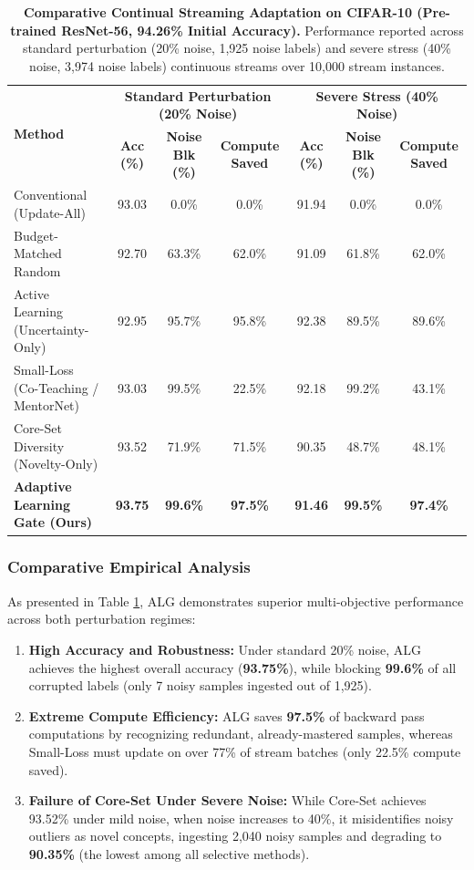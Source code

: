 \documentclass[journal,10pt,twocolumn]{article}
\begin{document}
\begin{table}[t]
\centering
\small
\caption{\textbf{Comparative Continual Streaming Adaptation on CIFAR-10 (Pre-trained ResNet-56, 94.26\% Initial Accuracy).} Performance reported across standard perturbation (20\% noise, 1,925 noise labels) and severe stress (40\% noise, 3,974 noise labels) continuous streams over 10,000 stream instances.}
\label{tab:main_results}
\begin{tabular}{l|ccc|ccc}
\toprule
\multirow{2}{*}{\textbf{Method}} & \multicolumn{3}{c|}{\textbf{Standard Perturbation (20\% Noise)}} & \multicolumn{3}{c}{\textbf{Severe Stress (40\% Noise)}} \\
& \textbf{Acc (\%)} & \textbf{Noise Blk (\%)} & \textbf{Compute Saved} & \textbf{Acc (\%)} & \textbf{Noise Blk (\%)} & \textbf{Compute Saved} \\
\midrule
Conventional (Update-All) & 93.03 & 0.0\% & 0.0\% & 91.94 & 0.0\% & 0.0\% \\
Budget-Matched Random & 92.70 & 63.3\% & 62.0\% & 91.09 & 61.8\% & 62.0\% \\
Active Learning (Uncertainty-Only) & 92.95 & 95.7\% & 95.8\% & 92.38 & 89.5\% & 89.6\% \\
Small-Loss (Co-Teaching / MentorNet) & 93.03 & 99.5\% & 22.5\% & 92.18 & 99.2\% & 43.1\% \\
Core-Set Diversity (Novelty-Only) & 93.52 & 71.9\% & 71.5\% & 90.35 & 48.7\% & 48.1\% \\
\textbf{Adaptive Learning Gate (Ours)} & \textbf{93.75} & \textbf{99.6\%} & \textbf{97.5\%} & \textbf{91.46} & \textbf{99.5\%} & \textbf{97.4\%} \\
\bottomrule
\end{tabular}
\end{table}

\subsubsection{Comparative Empirical Analysis}
As presented in Table \ref{tab:main_results}, ALG demonstrates superior multi-objective performance across both perturbation regimes:
\begin{enumerate}
    \item \textbf{High Accuracy and Robustness:} Under standard 20\% noise, ALG achieves the highest overall accuracy (\textbf{93.75\%}), while blocking \textbf{99.6\%} of all corrupted labels (only 7 noisy samples ingested out of 1,925).
    \item \textbf{Extreme Compute Efficiency:} ALG saves \textbf{97.5\%} of backward pass computations by recognizing redundant, already-mastered samples, whereas Small-Loss must update on over 77\% of stream batches (only 22.5\% compute saved).
    \item \textbf{Failure of Core-Set Under Severe Noise:} While Core-Set achieves 93.52\% under mild noise, when noise increases to 40\%, it misidentifies noisy outliers as novel concepts, ingesting 2,040 noisy samples and degrading to \textbf{90.35\%} (the lowest among all selective methods).
\end{enumerate}
\end{document}
